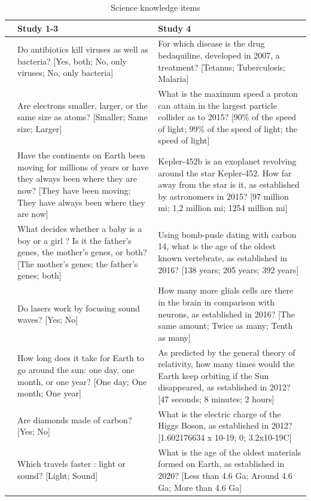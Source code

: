 \documentclass[
  doc,floatsintext]{apa6}
\begin{document}
\begin{longtable}[t]{>{\raggedleft\arraybackslash}p{2em}>{\raggedright\arraybackslash}p{22em}>{\raggedright\arraybackslash}p{22em}}
\caption{\label{tab:knowledge}Science knowledge items}\\
\toprule
 & Study 1-3 & Study 4\\
\midrule
1 & Do antibiotics kill viruses as well as bacteria? [Yes, both; No, only viruses; No, only bacteria] & For which disease is the drug bedaquiline, developed in 2007, a treatment? [Tetanus; Tuberculosis; Malaria]\\
2 & Are electrons smaller, larger, or the same size as atoms? [Smaller; Same size; Larger] & What is the maximum speed a proton can attain in the largest particle collider as to 2015? [90\% of the speed of light; 99\% of the speed of light; the speed of light]\\
3 & Have the continents on Earth been moving for millions of years or have they always been where they are now? [They have been moving; They have always been where they are now] & Kepler-452b is an exoplanet revolving around the star Kepler-452. How far away from the star is it, as established by astronomers in 2015? [97 million mi; 1,2 million mi; 1254 million mi]\\
4 & What decides whether a baby is a boy or a girl ? Is it the father's genes, the mother's genes, or both? [The mother's genes; the father's genes; both] & Using bomb-pusle dating with carbon 14, what is the age of the oldest known vertebrate, as established in 2016? [138 years; 205 years;  392 years]\\
5 & Do lasers work by focusing sound waves? [Yes; No] & How many more glials cells are there in the brain in comparison with neurons, as established in 2016? [The same amount; Twice as many; Tenth as many]\\
\addlinespace
6 & How long does it take for Earth to go around the sun: one day, one month, or one year? [One day; One month; One year] & As predicted by the general theory of relativity, how many times would the Earth keep orbiting if the Sun disappeared, as established in 2012? [47 seconds; 8 minutes;  2 hours]\\
7 & Are diamonds made of carbon? [Yes; No] & What is the electric charge of the Higgs Boson, as established in 2012? [1.602176634 x 10-19; 0; 3.2x10-19C]\\
8 & Which travels faster : light or sound? [Light; Sound] & What is the age of the oldest materials formed on Earth, as established in 2020? [Less than 4.6 Ga; Around 4.6 Ga; More than 4.6 Ga]\\

\end{longtable}
\end{document}
